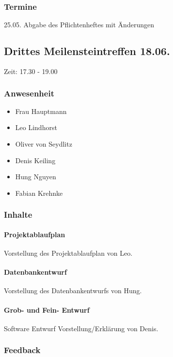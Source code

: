 \subsubsection{Termine}

25.05. Abgabe des Pflichtenheftes mit Änderungen


\subsection{Drittes Meilensteintreffen 18.06.}

Zeit: 17.30 - 19.00

\subsubsection{Anwesenheit}
\begin{itemize}
	\item Frau Hauptmann
	\item Leo Lindhorst
	\item Oliver von Seydlitz
	\item Denis Keiling
	\item Hung Nguyen
	\item Fabian Krehnke
\end{itemize}

\subsubsection{Inhalte} 

\paragraph{Projektablaufplan}
Vorstellung des Projektablaufplan von Leo.


\paragraph{Datenbankentwurf}
Vorstellung des Datenbankentwurfs von Hung. 


\paragraph{Grob- und Fein- Entwurf}
Software Entwurf Vorstellung/Erklärung von Denis.


\subsubsection{Feedback}

